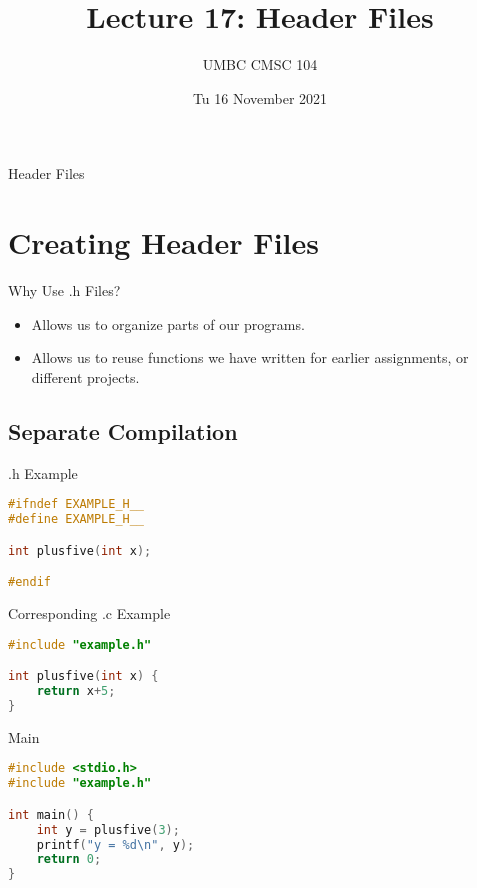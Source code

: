 \documentclass[graphics]{beamer}
\title{Lecture 17: Header Files}
\author{UMBC CMSC 104}
\date{Tu 16 November 2021}
\begin{document}
\begin{frame}{}
\centering
    Header Files
\end{frame}

\frame{\tableofcontents}

\section{Creating Header Files}
\begin{frame}{Why Use .h Files?}
    \begin{itemize}
        \item Allows us to organize parts of our programs.
        \item Allows us to reuse functions we have written for earlier assignments, or different projects.
    \end{itemize}
\end{frame}

\subsection{Separate Compilation}
\begin{frame}[fragile]{.h Example}
    \begin{lstlisting}[language=C,basicstyle=\footnotesize,keywordstyle=\color{blue},commentstyle=\color{green},showstringspaces=false,stringstyle=\color{red}]
#ifndef EXAMPLE_H__
#define EXAMPLE_H__

int plusfive(int x);

#endif
    \end{lstlisting}
\end{frame}

\begin{frame}[fragile]{Corresponding .c Example}
    \begin{lstlisting}[language=C,basicstyle=\footnotesize,keywordstyle=\color{blue},commentstyle=\color{green},showstringspaces=false,stringstyle=\color{red}]
#include "example.h"

int plusfive(int x) {
    return x+5;
}
    \end{lstlisting}
\end{frame}

\begin{frame}[fragile]{Main}
    \begin{lstlisting}[language=C,basicstyle=\footnotesize,keywordstyle=\color{blue},commentstyle=\color{green},showstringspaces=false,stringstyle=\color{red}]
#include <stdio.h>
#include "example.h"

int main() {
    int y = plusfive(3);
    printf("y = %d\n", y);
    return 0;
}
    \end{lstlisting}
\end{frame}
\end{document}

